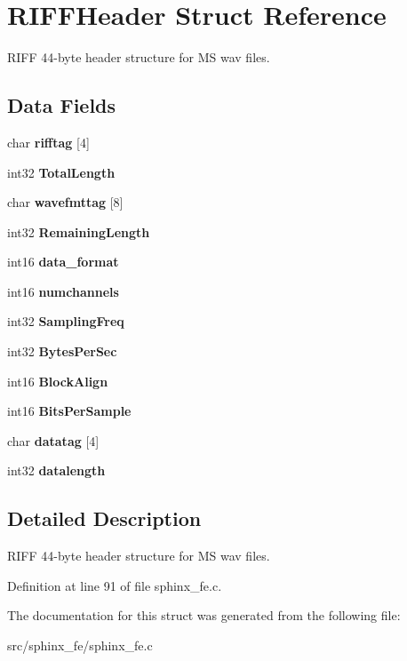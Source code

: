 \section{R\+I\+F\+F\+Header Struct Reference}
\label{structRIFFHeader}


R\+I\+FF 44-\/byte header structure for MS wav files.  


\subsection*{Data Fields}
\begin{DoxyCompactItemize}
\item 
\mbox{\label{structRIFFHeader_a41ad222f7a391957baebb72b520ca313}} 
char {\bfseries rifftag} [4]
\item 
\mbox{\label{structRIFFHeader_a0432c23ba2c7421bc1a918e813e89b74}} 
int32 {\bfseries Total\+Length}
\item 
\mbox{\label{structRIFFHeader_ab02082cd826cc18e14bf1509936d96d6}} 
char {\bfseries wavefmttag} [8]
\item 
\mbox{\label{structRIFFHeader_a4f124bd29a8d7a36de8281d2bc836353}} 
int32 {\bfseries Remaining\+Length}
\item 
\mbox{\label{structRIFFHeader_a6d51315afb5ee7c17ec42fed06ef72df}} 
int16 {\bfseries data\+\_\+format}
\item 
\mbox{\label{structRIFFHeader_ab639e289d0009f82f7860edd8e324daf}} 
int16 {\bfseries numchannels}
\item 
\mbox{\label{structRIFFHeader_a7723e76cc1ff383b0f4f7a053f43d31f}} 
int32 {\bfseries Sampling\+Freq}
\item 
\mbox{\label{structRIFFHeader_a003ffd3a4cc8cd55c7b4031723c5bac1}} 
int32 {\bfseries Bytes\+Per\+Sec}
\item 
\mbox{\label{structRIFFHeader_a88c8a1a0cc69b955eada53fd28078497}} 
int16 {\bfseries Block\+Align}
\item 
\mbox{\label{structRIFFHeader_ad7a6f7b03f79a574ba5edd47e9a3451c}} 
int16 {\bfseries Bits\+Per\+Sample}
\item 
\mbox{\label{structRIFFHeader_ad8c58fa74d6d52637aa6f674a3a9482d}} 
char {\bfseries datatag} [4]
\item 
\mbox{\label{structRIFFHeader_a8900896018b1277439d20d824d8c3aba}} 
int32 {\bfseries datalength}
\end{DoxyCompactItemize}


\subsection{Detailed Description}
R\+I\+FF 44-\/byte header structure for MS wav files. 



Definition at line 91 of file sphinx\+\_\+fe.\+c.



The documentation for this struct was generated from the following file\+:\begin{DoxyCompactItemize}
\item 
src/sphinx\+\_\+fe/sphinx\+\_\+fe.\+c\end{DoxyCompactItemize}
